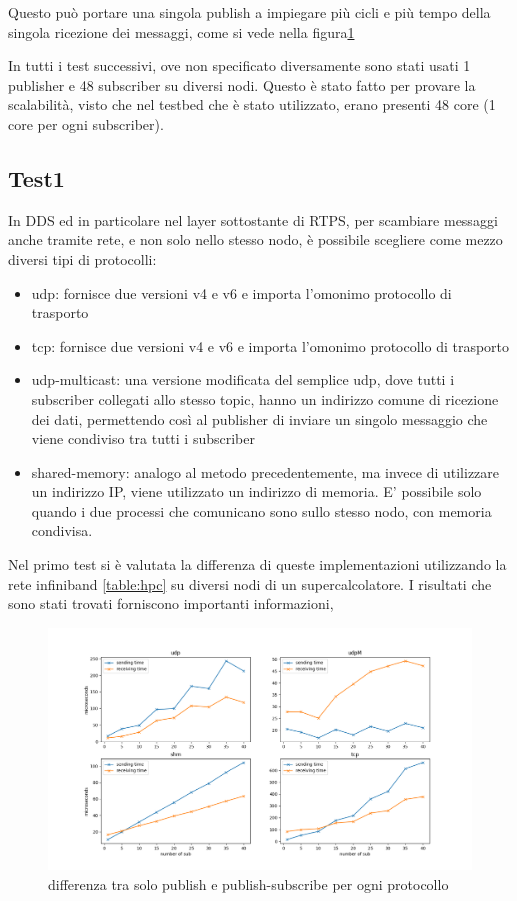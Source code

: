 Questo può portare una singola publish a impiegare più cicli e più tempo della singola ricezione dei messaggi, come si vede nella figura\ref{fig:test3_different_protocols}

In tutti i test successivi, ove non specificato diversamente sono stati usati 1 publisher e 48 subscriber su diversi nodi. Questo è stato fatto per provare la scalabilità, visto che nel testbed che è stato utilizzato, erano presenti 48 core (1 core per ogni subscriber).

\subsection{Test1}
In DDS ed in particolare nel layer sottostante di RTPS, per scambiare messaggi anche tramite rete, e non solo nello stesso nodo, è possibile scegliere come mezzo diversi tipi di protocolli:

\begin{itemize}
    \item udp: fornisce due versioni v4 e v6 e importa l'omonimo protocollo di trasporto
    \item tcp: fornisce due versioni v4 e v6 e importa l'omonimo protocollo di trasporto
    \item udp-multicast: una versione modificata del semplice udp, dove tutti i subscriber collegati allo stesso topic, hanno un indirizzo comune di ricezione dei dati, permettendo così al publisher di inviare un singolo messaggio che viene condiviso tra tutti i subscriber  %
    \item shared-memory: analogo al metodo precedentemente, ma invece di utilizzare un indirizzo IP, viene utilizzato un indirizzo di memoria. E' possibile solo quando i due processi che comunicano sono sullo stesso nodo, con memoria condivisa.
\end{itemize}

Nel primo test si è valutata la differenza di queste implementazioni utilizzando la rete infiniband \ref{table:hpc} su diversi nodi di un supercalcolatore. I risultati che sono stati trovati forniscono importanti informazioni, %

\begin{figure}[H]
    \includegraphics[width=\textwidth]{./results/test3_different_protocol_send_receive.png} %
        \caption{differenza tra solo publish e publish-subscribe per ogni protocollo}
        \label{fig:test3_different_protocols}
\end{figure}


